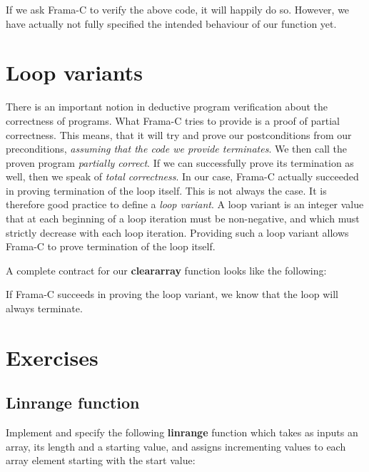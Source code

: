 
If we ask Frama-C to verify the above code, it will happily do so. However, we have actually not fully specified the intended behaviour of our function yet. 

\section{Loop variants}

There is an important notion in deductive program verification about the correctness of programs. What Frama-C tries to provide is a proof of partial correctness. This means, that it will try and prove our postconditions from our preconditions, \emph{assuming that the code we provide terminates}. We then call the proven program \emph{partially correct}.  If we can successfully prove its termination as well, then we speak of \emph{total correctness}. In our case, Frama-C actually succeeded in proving termination of the loop itself. This is not always the case. It is therefore good practice to define a \emph{loop variant}. A loop variant is an integer value that at each beginning of a loop iteration must be non-negative, and which must strictly decrease with each loop iteration. Providing such a loop variant allows Frama-C to prove termination of the loop itself. 

A complete contract for our \textbf{clear\textunderscore array} function looks like the following:


If Frama-C succeeds in proving the loop variant, we know that the loop will always terminate. 

\section{Exercises}

\subsection{Linrange function}

Implement and specify the following \textbf{linrange} function which takes as inputs an array, its length and a starting value, and assigns incrementing values to each array element starting with the start value:


